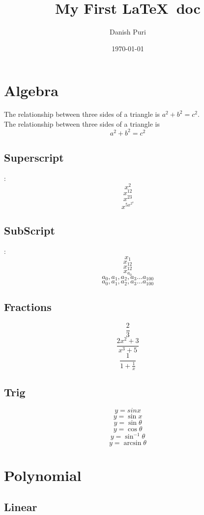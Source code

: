 \documentclass[]{article}
\title{My First \LaTeX\ doc}
\author{Danish Puri}
\date{\today}
\begin{document}
\maketitle
\tableofcontents
\vspace{1 cm}

\section{Algebra}
The relationship between three sides of a triangle is $a^2 +b^2 = c^2$. \\
\vspace{1 cm }
The relationship between three sides of a triangle is $$a^2 +b^2 = c^2$$


\subsection{Superscript}:
    $$x^2$$
    $$x^12$$ %
    $$x^{23}$$ %
    $$x^{5x^{2^4}}$$

\subsection{SubScript}:
    $$x_1$$
    $$x_12$$ %
    $$x_{12}$$ %
    $$x_{a_0}$$
    $$a_0, a_1, a_2, a_3 ... a_{100} $$
       $$a_0, a_1, a_2, a_3 \ldots a_{100} $$

\subsection{Fractions}
    $$\frac{2}{3}$$
    $$\frac{2x^2+3}{x^3+5}$$
    $$\frac{1}{1+\frac{1}{x}}$$

\subsection{Trig}
    $$ y = sin x$$ %
    $$y = \sin x$$ %
    $$y = \sin \theta$$
    $$y = \cos \theta$$
    $$ y = \sin ^{-1} \theta$$ %
    $$ y = \arcsin \theta $$ %

\section{Polynomial}
\subsection{Linear}
\end{document}
